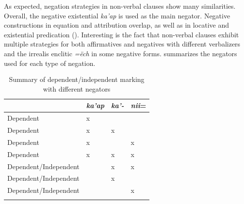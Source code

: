 \documentclass[output=paper,colorlinks,citecolor=brown,draft]{langscibook}
\begin{document}
As expected, negation strategies in non-verbal clauses show many similarities. Overall, the negative existential \textit{ka’ap} is used as the main negator. Negative constructions in equation and attribution overlap, as well as in locative and existential predication (). Interesting is the fact that non-verbal clauses exhibit multiple strategies for both affirmatives and negatives with different verbalizers and the irrealis enclitic \textit{=ëch} in some negative forms.
 summarizes the negators used for each type of negation.


\begin{table}[b]
\begin{tabularx}{\textwidth}{lXXl}
\lsptoprule
& \textit{ka’ap} & \textit{{ka’}-} & {\textit{nii}=}\\
\midrule
{Dependent} & {x} & & \\
{Dependent} & {x} & {x} & \\
{Dependent} & {x} & & {x}\\
{Dependent} & {x} & {x} & {x}\\
{Dependent/Independent} & & {x} & {x}\\
{Dependent/Independent} & & {x} & \\
{Dependent/Independent} & & & {x}\\
\lspbottomrule
\end{tabularx}
\caption{Summary of dependent/independent marking with different negators}
\label{tab:mix:11}
\end{table}
\end{document}
